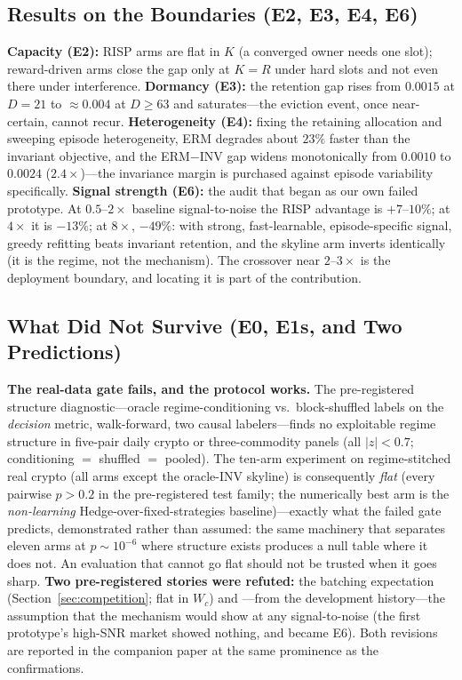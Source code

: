 \documentclass[10pt]{article}
\newcommand{\nm}{\textsc{RISP}}
\begin{document}
\subsection{Results on the Boundaries (E2, E3, E4, E6)}

\textbf{Capacity (E2):} \nm{} arms are flat in $K$ (a converged owner
needs one slot); reward-driven arms close the gap only at $K = R$ under
hard slots and not even there under interference. \textbf{Dormancy
(E3):} the retention gap rises from $0.0015$ at $D = 21$ to
$\approx 0.004$ at $D \ge 63$ and saturates---the eviction event, once
near-certain, cannot recur. \textbf{Heterogeneity (E4):} fixing the
retaining allocation and sweeping episode heterogeneity, ERM degrades about $23\%$ faster than the
invariant objective, and the ERM$-$INV gap widens monotonically from
$0.0010$ to $0.0024$ ($2.4\times$)---the invariance margin is
purchased against episode variability specifically. \textbf{Signal
strength (E6):} the audit that began as our own failed prototype. At
$0.5$--$2\times$ baseline signal-to-noise the \nm{} advantage is
$+7$--$10\%$; at $4\times$ it is $-13\%$; at $8\times$, $-49\%$: with
strong, fast-learnable, episode-specific signal, greedy refitting beats
invariant retention, and the skyline arm inverts identically (it is the
regime, not the mechanism). The crossover near $2$--$3\times$ is the
deployment boundary, and locating it is part of the contribution.

\subsection{What Did Not Survive (E0, E1s, and Two Predictions)}
\label{sec:exp-e0}

\textbf{The real-data gate fails, and the protocol works.} The
pre-registered structure diagnostic---oracle regime-conditioning vs.\
block-shuffled labels on the \emph{decision} metric, walk-forward, two
causal labelers---finds no exploitable regime structure in five-pair
daily crypto or three-commodity panels (all $|z| < 0.7$; conditioning
$=$ shuffled $=$ pooled). The ten-arm experiment on
regime-stitched real crypto (all arms except the oracle-INV skyline) is
consequently \emph{flat} (every pairwise $p > 0.2$ in the pre-registered
test family; the numerically best arm is the \emph{non-learning}
Hedge-over-fixed-strategies baseline)---exactly what the failed gate
predicts, demonstrated rather
than assumed: the same machinery that separates eleven arms at
$p \sim 10^{-6}$ where structure exists produces a null table where it
does not. An evaluation that cannot go flat should not be trusted when it
goes sharp. \textbf{Two pre-registered stories were refuted:} the
batching expectation (Section~\ref{sec:competition}; flat in $W_c$) and
---from the development history---the assumption that the mechanism would
show at any signal-to-noise (the first prototype's high-SNR market showed
nothing, and became E6). Both revisions are reported in the companion
paper at the same prominence as the confirmations.
\end{document}
